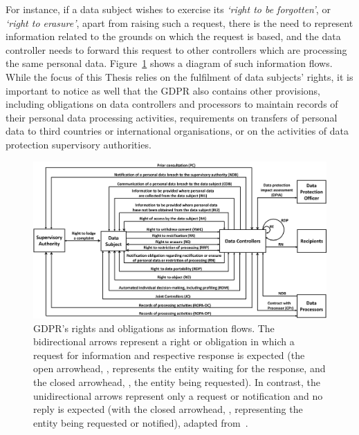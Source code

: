 For instance, if a data subject wishes to exercise its \textit{`right to be forgotten'}, or \textit{`right to erasure'}, apart from raising such a request, there is the need to represent information related to the grounds on which the request is based, and the data controller needs to forward this request to other controllers which are processing the same personal data.
Figure~\ref{fig:gdpr_information_flows} shows a diagram of such information flows.
While the focus of this Thesis relies on the fulfilment of data subjects' rights, it is important to notice as well that the GDPR also contains other provisions, including obligations on data controllers and processors to maintain records of their personal data processing activities, requirements on transfers of personal data to third countries or international organisations, or on the activities of data protection supervisory authorities.

\begin{landscape}
\begin{figure}[ht]
    \centering
    \includegraphics[width=\linewidth]{figures/chapter-1/information flow diagram.png}
    \caption[GDPR's rights and obligations as information flows.]{GDPR's rights and obligations as information flows. The bidirectional arrows represent a right or obligation in which a request for information and respective response is expected (the open arrowhead, , represents the entity waiting for the response, and the closed arrowhead, , the entity being requested). In contrast, the unidirectional arrows represent only a request or notification and no reply is expected (with the closed arrowhead, , representing the entity being requested or notified), adapted from~\cite{esteves_analysis_2022}.}
    \label{fig:gdpr_information_flows}
\end{figure}
\end{landscape}

